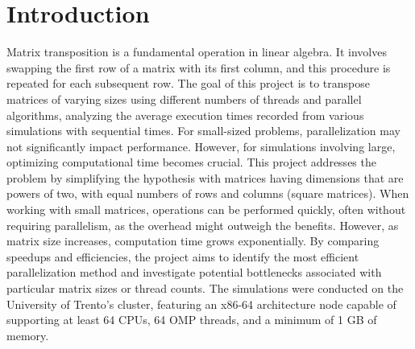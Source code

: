 \section{Introduction}
Matrix transposition is a fundamental operation in linear algebra. It involves swapping the first row of a matrix with its first column, and this procedure is repeated for each subsequent row.
The goal of this project is to transpose matrices of varying sizes using different numbers of threads and parallel algorithms, analyzing the average execution times recorded from various simulations with sequential times.
For small-sized problems, parallelization may not significantly impact performance. However, for simulations involving large, optimizing computational time becomes crucial. This project addresses the problem by simplifying the hypothesis with matrices having dimensions that are powers of two, with equal numbers of rows and columns (square matrices).
When working with small matrices, operations can be performed quickly, often without requiring parallelism, as the overhead might outweigh the benefits.
However, as matrix size increases, computation time grows exponentially. 
By comparing speedups and efficiencies, the project aims to identify the most efficient parallelization method and investigate potential bottlenecks associated with particular matrix sizes or thread counts.
The simulations were conducted on the University of Trento's cluster, featuring an x86-64 architecture node capable of supporting at least 64 CPUs, 64 OMP threads, and a minimum of 1 GB of memory. 
